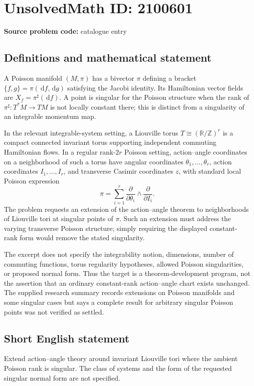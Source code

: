 \documentclass[11pt]{article}
\newcommand{\Z}{\mathbb{Z}}
\newcommand{\R}{\mathbb{R}}
\newcommand{\dd}{\,\mathrm{d}}
\begin{document}
\section*{UnsolvedMath ID: 2100601}
\textbf{Source problem code:} catalogue entry
\subsection{Definitions and mathematical statement}
A Poisson manifold \((M,\pi)\) has a bivector \(\pi\) defining a bracket \(\{f,g\}=\pi(\dd f,\dd g)\) satisfying the Jacobi identity. Its Hamiltonian vector fields are \(X_f=\pi^\sharp(\dd f)\). A point is singular for the Poisson structure when the rank of \(\pi^\sharp:T^*M\to TM\) is not locally constant there; this is distinct from a singularity of an integrable momentum map.

In the relevant integrable-system setting, a Liouville torus \(T\cong(\R/\Z)^r\) is a compact connected invariant torus supporting independent commuting Hamiltonian flows. In a regular rank-\(2r\) Poisson setting, action--angle coordinates on a neighborhood of such a torus have angular coordinates \(\theta_1,\ldots,\theta_r\), action coordinates \(I_1,\ldots,I_r\), and transverse Casimir coordinates \(z\), with standard local Poisson expression
\[
\pi=\sum_{i=1}^r\frac{\partial}{\partial\theta_i}\wedge
\frac{\partial}{\partial I_i}.
\]
The problem requests an extension of the action--angle theorem to neighborhoods of Liouville tori at singular points of \(\pi\). Such an extension must address the varying transverse Poisson structure; simply requiring the displayed constant-rank form would remove the stated singularity.

The excerpt does not specify the integrability notion, dimensions, number of commuting functions, torus regularity hypotheses, allowed Poisson singularities, or proposed normal form. Thus the target is a theorem-development program, not the assertion that an ordinary constant-rank action--angle chart exists unchanged. The supplied research summary records extensions on Poisson manifolds and some singular cases but says a complete result for arbitrary singular Poisson points was not verified as settled.
\subsection{Short English statement}
Extend action--angle theory around invariant Liouville tori where the ambient Poisson rank is singular. The class of systems and the form of the requested singular normal form are not specified.
\end{document}
